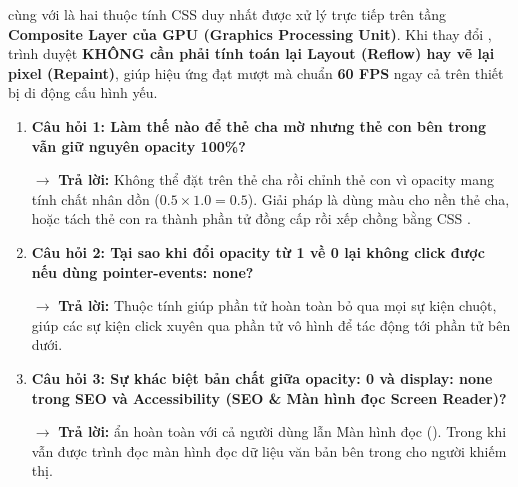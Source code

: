 \begin{tipBox}
 cùng với  là hai thuộc tính CSS duy nhất được xử lý trực tiếp trên tầng \textbf{Composite Layer của GPU (Graphics Processing Unit)}. Khi thay đổi , trình duyệt \textbf{KHÔNG cần phải tính toán lại Layout (Reflow) hay vẽ lại pixel (Repaint)}, giúp hiệu ứng đạt mượt mà chuẩn \textbf{60 FPS} ngay cả trên thiết bị di động cấu hình yếu.
\end{tipBox}

\begin{warnBox}
\begin{enumerate}[leftmargin=1.5em, itemsep=5pt, parsep=0pt]
    \item \textbf{Câu hỏi 1: Làm thế nào để thẻ cha mờ nhưng thẻ con bên trong vẫn giữ nguyên opacity 100\%?} \par
    $\rightarrow$ \textbf{Trả lời:} Không thể đặt  trên thẻ cha rồi chỉnh thẻ con  vì opacity mang tính chất nhân dồn ($0.5 \times 1.0 = 0.5$). Giải pháp là dùng màu  cho nền thẻ cha, hoặc tách thẻ con ra thành phần tử đồng cấp rồi xếp chồng bằng CSS .

    \item \textbf{Câu hỏi 2: Tại sao khi đổi opacity từ 1 về 0 lại không click được nếu dùng pointer-events: none?} \par
    $\rightarrow$ \textbf{Trả lời:} Thuộc tính  giúp phần tử hoàn toàn bỏ qua mọi sự kiện chuột, giúp các sự kiện click xuyên qua phần tử vô hình để tác động tới phần tử bên dưới.

    \item \textbf{Câu hỏi 3: Sự khác biệt bản chất giữa opacity: 0 và display: none trong SEO và Accessibility (SEO \& Màn hình đọc Screen Reader)?} \par
    $\rightarrow$ \textbf{Trả lời:}  ẩn hoàn toàn với cả người dùng lẫn Màn hình đọc (). Trong khi  vẫn được trình đọc màn hình đọc dữ liệu văn bản bên trong cho người khiếm thị.
\end{enumerate}
\end{warnBox}


